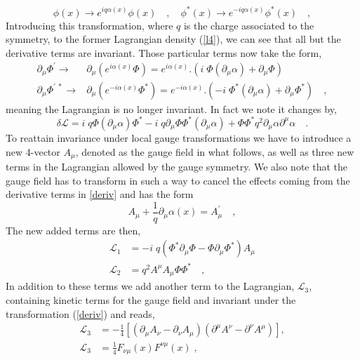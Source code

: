 \documentclass[12pt]{article}
\begin{document}
%
\begin{equation}
\phi(x) \rightarrow e^{i q \alpha (x)} \phi (x) \quad , \quad \phi^*  (x)\rightarrow e^{-i q \alpha (x)} \phi^* (x)  \quad ,
\end{equation}
%
Introducing this transformation, where $q$ is the charge associated to the symmetry, to the former Lagrangian density (\ref{l4}), we can see that all but the derivative terms are invariant. Those particular terms now take the form,
%
\begin{align}
\partial_\mu \Phi^\prime \rightarrow &  \partial_\mu \left(e^{i \alpha(x)} \Phi \right) = e^{i \alpha \left(x\right)}.\left(  i \; \Phi (\partial_\mu \alpha )   + \partial_\mu \Phi \right) \\
\partial_\mu \Phi^{\prime \ *} \rightarrow &  \partial_\mu \left( e^{-i \alpha \left(x \right)} \Phi^* \right) =  e^{-i \alpha \left(x \right)}.\left(  -i \; \Phi^* (\partial_\mu \alpha )   + \partial_\mu \Phi^* \right) \quad , 
\label{deriv}
\end{align}
%
meaning the Lagrangian is no longer invariant. In fact we note it changes by, 
\begin{equation}
\delta \mathcal{L} =   i \; q \Phi (\partial_\mu \alpha )  \Phi^* - i \; q \partial_\mu \Phi \Phi^* (\partial_\mu \alpha ) + \Phi \Phi^* q^2 \partial_\mu \alpha \partial^\mu \alpha    \quad . 
\end{equation}
%
To reattain invariance under local gauge transformations we have to introduce a new 4-vector $A_\mu$, denoted as the gauge field in what follows, as well as three new terms in the Lagrangian allowed by the gauge symmetry. We also note that the gauge field has to transform in such a way to cancel the effects coming from the derivative terms in \ref{deriv} and has the form
%
%
\begin{equation}
 A_\mu + \frac{1}{q} \partial_\mu \alpha \left(x \right)=A_\mu^\prime \quad , 
\end{equation} 
%
The new added terms are then,
%
\begin{align}
\mathcal{L}_1 & =  - i \; q \left( \Phi^* \partial_\mu \Phi  - \Phi \partial_\mu \Phi^* \right) A_\mu \\
\mathcal{L}_2 & =  q^2  A^\mu A_\mu \Phi \Phi^*  \quad , 
\end{align}
%
%
In addition to these terms we add another term to the Lagrangian, $\mathcal{L}_3$, containing kinetic terms for the gauge field and invariant under the transformation (\ref{deriv}) and reads,
%
\begin{align}
\mathcal{L}_3 & = -\frac{1}{4} \left[ \left( \partial_\mu A_\nu - \partial_\nu A_\mu \right) \left( \partial^\mu A^\nu - \partial^\nu A^\mu \right) \right] , \nonumber \\ \mathcal{L}_3  &= \frac{1}{4} F_{\nu \mu}(x)  F^{\nu \mu}(x) \;  , 
\end{align}
\end{document}
